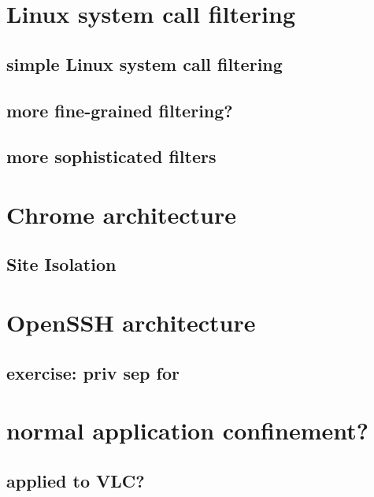 \section{Linux system call filtering}
\subsection{simple Linux system call filtering}


\subsection{more fine-grained filtering?}






\subsection{more sophisticated filters}
\section{Chrome architecture}


\subsection{Site Isolation}


\section{OpenSSH architecture}


\subsection{exercise: priv sep for}


\section{normal application confinement?}



\subsection{applied to VLC?}


